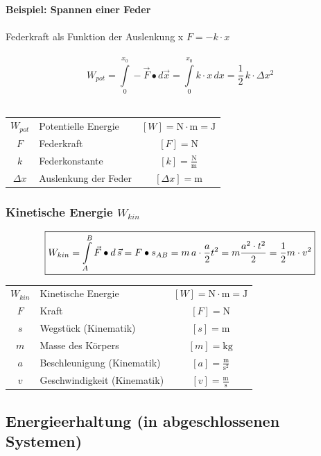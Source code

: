 			\textbf{Beispiel: Spannen einer Feder} \\
				\\  
				Federkraft als Funktion der Auslenkung x \qquad $F = -k \cdot x$ \\
				\\
				$$ \boxed{ W_{pot} = \int \limits_0^{x_0}  - \vec{F} \bullet d \vec{x} = \int \limits_0^{x_0}  k \cdot x \, dx = \frac{1}{2} \, k \cdot \Delta x^2} $$ \\
				
			\begin{tabular}{c l c}
				$W_{pot}$ & Potentielle Energie & $[W] = \mathrm{N \cdot m = J}$ \\
				$F$ & Federkraft & $[F] = \mathrm{N} $ \\
				$k$ & Federkonstante & $[k] = \mathrm{\frac{N}{m}}$ \\
				$\Delta x$ & Auslenkung der Feder & $[\Delta x] = \mathrm{m}$ \\
			\end{tabular}

			\vfill\null
			\columnbreak

		\subsubsection{Kinetische Energie $W_{kin}$}
		
			$$ \boxed{ \normalsize{ W_{kin} = \int \limits_A^B \vec{F} \bullet d \, \vec{s} =  F \bullet s_{AB} = m \, a \cdot \frac{a}{2} t^2 = m \frac{a^2 \cdot t^2}{2} = \frac{1}{2} m \cdot v^2} }$$
			
			\begin{tabular}{c l c}
				$W_{kin}$ & Kinetische Energie & $[W] = \mathrm{N \cdot m = J}$ \\
				$F$ & Kraft & $[F] = \mathrm{N} $ \\
				$s$ & Wegstück (Kinematik) & $[s] = \mathrm{m}$ \\
				$m$ & Masse des Körpers & $[m] = \mathrm{kg}$ \\
				$a$ & Beschleunigung (Kinematik) & $[a] = \mathrm{\frac{m}{s^2}}$ \\
				$v$ & Geschwindigkeit (Kinematik) & $[v] = \mathrm{\frac{m}{s}}$ \\
			\end{tabular}

	\subsection{Energieerhaltung (in abgeschlossenen Systemen)}
	
